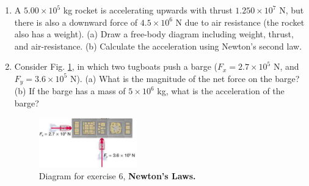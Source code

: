 \documentclass[10pt]{article}
\begin{document}
\begin{enumerate}
\item A $5.00\times 10^5$ kg rocket is accelerating upwards with thrust $1.250\times 10^7$ N, but there is also a downward force of $4.5\times 10^6$ N due to air resistance (the rocket also has a weight). (a) Draw a free-body diagram including weight, thrust, and air-resistance.  (b) Calculate the acceleration using Newton's second law. \\ \vspace{2.5cm}
\item Consider Fig. \ref{fig:tug}, in which two tugboats push a barge ($F_x = 2.7\times 10^5$ N, and $F_y = 3.6\times 10^5$ N).  (a) What is the magnitude of the net force on the barge? (b) If the barge has a mass of $5\times 10^6$ kg, what is the acceleration of the barge? \vspace{2.5cm}
\begin{figure}[h]
\centering
\includegraphics[width=0.4\textwidth]{figures/tug.png}
\caption{\label{fig:tug} Diagram for exercise 6, \textbf{Newton's Laws.}}
\end{figure}
\end{enumerate}
\end{document}

